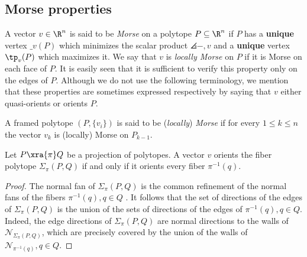 
\subsection{Morse properties}




A vector $v \in \R^n$ is said to be \textit{Morse} on a polytope $P \subseteq \R^n$ if $P$ has a \textbf{unique} vertex $\bm_v(P)$ which minimizes the scalar product $\angles{-,v}$ and a \textbf{unique} vertex $\tp_v(P)$ which maximizes it.
We say that $v$ is \textit{locally Morse} on $P$ if it is Morse on each face of $P$.
It is easily seen that it is sufficient to verify this property only on the edges of $P$.
Although we do not use the following terminology, we mention that these properties are sometimes expressed respectively by saying that $v$ either quasi-orients or orients $P$.

A framed polytope $(P, \{v_i\})$ is said to be (\textit{locally}) \textit{Morse} if for every $1 \leq k \leq n$ the vector $v_k$ is (locally) Morse on $P_{k-1}$.


\begin{lemma} \label{l:orients-the-fibers}
	Let $P \xra{\pi} Q$ be a projection of polytopes.
	A vector $v$ orients the fiber polytope $\Sigma_\pi(P, Q)$ if and only if it orients every fiber $\pi^{-1}(q)$.
\end{lemma}

\begin{proof}
	The normal fan of $\Sigma_\pi(P,Q)$ is the common refinement of the normal fans of the fibers $\pi^{-1}(q), q \in Q$ \cite[Proposition 2.2]{BilleraSturmfels94}.
	It follows that the set of directions of the edges of $\Sigma_\pi(P,Q)$ is the union of the sets of directions of the edges of $\pi^{-1}(q), q \in Q$.
	Indeed, the edge directions of $\Sigma_\pi(P,Q)$ are normal directions to the walls of $\mathcal{N}_{\Sigma_\pi(P,Q)}$, which are precisely covered by the union of the walls of $\mathcal{N}_{\pi^{-1}(q)}, q \in Q$.
\end{proof}

